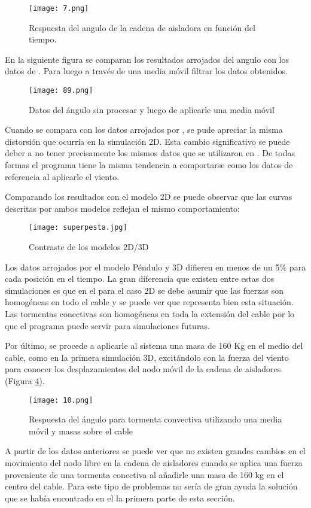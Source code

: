 \begin{figure}[h]
	\centering
	\label{anguotiempo3d}
	\texttt{[image: 7.png]}
	\caption{Respuesta del angulo de la cadena de aisladora en función del tiempo.}
\end{figure}


En la siguiente figura se comparan los resultados arrojados del angulo con los datos de \cite{stengel2017measurements}. Para luego a través de una media móvil filtrar los datos obtenidos.


\begin{figure}[h]
	\centering
	\texttt{[image: 89.png]}
	\caption{Datos del ángulo sin procesar y luego de aplicarle una media móvil}
	\label{21}
\end{figure}


Cuando se compara con los datos arrojados por \cite{stengel2017measurements}, se pude apreciar la misma distorsión que ocurría en la simulación 2D. Esta cambio significativo se puede deber a no tener precisamente los mismos datos que se utilizaron en \cite{stengel2017measurements}. De todas formas el programa tiene la misma tendencia a comportarse como los datos de referencia al aplicarle el viento. 

Comparando los resultados con el modelo 2D se puede observar que las curvas descritas por ambos modelos reflejan el mismo comportamiento:

\begin{figure}[h]
	\centering
	\texttt{[image: superpesta.jpg]}
	\caption{Contraste de los modelos 2D/3D}
	\label{2dvs3d}
\end{figure}

Los datos arrojados por el modelo Péndulo y 3D difieren en menos de un 5\% para cada posición en el tiempo. La gran diferencia que existen entre estas dos simulaciones es que en el para el caso 2D se debe asumir que las fuerzas son homogéneas en todo el cable y se puede ver que representa bien esta situación.  Las tormentas conectivas son homogéneas en toda la extensión del cable por lo que el programa puede servir para simulaciones futuras.



Por último, se procede a aplicarle al sistema una masa de 160 Kg en el medio del cable, como en la primera simulación 3D, excitándolo con la fuerza del viento para conocer los desplazamientos del nodo móvil de la cadena de aisladores.(Figura \ref{respuestaconmasas}).


\begin{figure}[h]
	\centering
	\texttt{[image: 10.png]}
	\caption{Respuesta del ángulo para tormenta convectiva utilizando una media móvil y masas sobre el cable}
	\label{respuestaconmasas}
\end{figure}

A partir de los datos anteriores se puede ver que no existen grandes cambios en el movimiento del nodo libre en la cadena de aisladores cuando se aplica una fuerza proveniente de una tormenta conectiva al añadirle una masa de 160 kg en el centro del cable. Para este tipo de problemas no sería de gran ayuda la solución que se había encontrado en el la primera parte de esta sección.